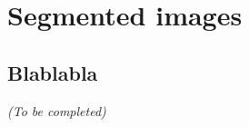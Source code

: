 
\graphicspath{{../../figures/appendix/}}

\chapter{Segmented images}
\label{ch:segmentation_images_appendix}

\newpage

\section{Blablabla}
\label{sec:blablabla_segmentation_appendix}

\begin{center}
	\textit{(To be completed)}
\end{center}
